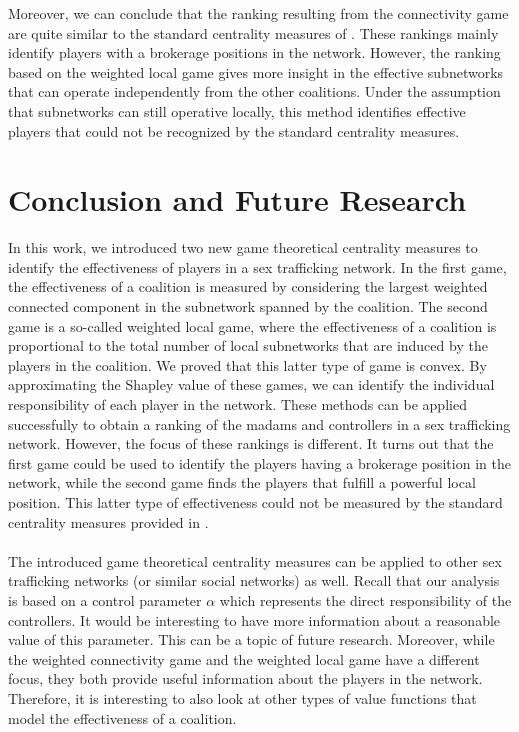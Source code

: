 \documentclass[10p]{article}
\theoremstyle{definition}
\theoremstyle{definition}
\begin{document}
Moreover, we can conclude that the ranking resulting from the connectivity game are quite similar to the standard centrality measures of \cite{mancuso2014not}. These rankings mainly identify players with a brokerage positions in the network. However, the ranking based on the weighted local game gives more insight in the effective subnetworks that can operate independently from the other coalitions. Under the assumption that subnetworks can still operative locally, this method identifies effective players that could not be recognized by the standard centrality measures. 

\section{Conclusion and Future Research}
In this work, we introduced two new game theoretical centrality measures to identify the effectiveness of players in a sex trafficking network. In the first game, the effectiveness of a coalition is measured by considering the largest weighted connected component in the subnetwork spanned by the coalition. The second game is a so-called weighted local game, where the effectiveness of a coalition is proportional to the total number of local subnetworks that are induced by the players in the coalition. We proved that this latter type of game is convex. By approximating the Shapley value of these games, we can identify the individual responsibility of each player in the network. These methods can be applied successfully to obtain a ranking of the madams and controllers in a sex trafficking network. However, the focus of these rankings is different. It turns out that the first game could be used to identify the players having a brokerage position in the network, while the second game finds the players that fulfill a powerful local position. This latter type of effectiveness could not be measured by the standard centrality measures provided in \cite{mancuso2014not}.\\ \\
The introduced game theoretical centrality measures can be applied to other sex trafficking networks (or similar social networks) as well. Recall that our analysis is based on a control parameter $\alpha$ which represents the direct responsibility of the controllers. It would be interesting to have more information about a reasonable value of this parameter. This can be a topic of future research. Moreover, while the weighted connectivity game and the weighted local game have a different focus, they both provide useful information about the players in the network. Therefore, it is interesting to also look at other types of value functions that model the effectiveness of a coalition.
\end{document}
